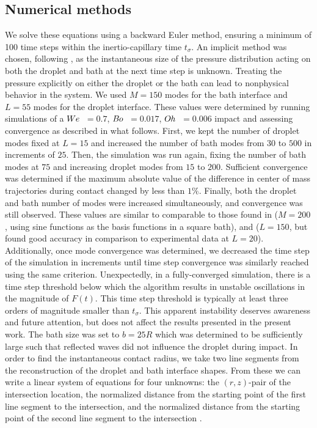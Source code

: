 \documentclass{jfm}
\begin{document}
\subsection{Numerical methods}
\hspace*{1em} We solve these equations using a backward Euler method, ensuring a minimum of 100 time steps within the inertio-capillary time $t_{\sigma}$. An implicit method was chosen, following \cite{galeano2021capillary}, as the instantaneous size of the pressure distribution acting on both the droplet and bath at the next time step is unknown. Treating the pressure explicitly on either the droplet or the bath can lead to nonphysical behavior in the system. We used $M=150$ modes for the bath interface and $L=55$ modes for the droplet interface. These values were determined by running simulations of a $W\kern-0.03em e\,$ $=0.7$, $B\kern-0.04em o\,$ $=0.017$, $O\kern-0.04em h\,$ $=0.006$ impact and assessing convergence as described in what follows. First, we kept the number of droplet modes fixed at $L=15$ and increased the number of bath modes from $30$ to $500$ in increments of $25$. Then, the simulation was run again, fixing the number of bath modes at $75$ and increasing droplet modes from $15$ to $200$. Sufficient convergence was determined if the maximum absolute value of the difference in center of mass trajectories during contact changed by less than $1\%$. Finally, both the droplet and bath number of modes were increased simultaneously, and convergence was still observed. These values are similar to comparable to those found in \cite{blanchette2016modeling} ($M=200$, using sine functions as the basis functions in a square bath), and \cite{molavcek2012quasi} ($L=150$, but found good accuracy in comparison to experimental data at $L=20$). Additionally, once mode convergence was determined, we decreased the time step of the simulation in increments until time step convergence was similarly reached using the same criterion. Unexpectedly, in a fully-converged simulation, there is a time step threshold below which the algorithm results in unstable oscillations in the magnitude of $F(t)$. This time step threshold is typically at least three orders of magnitude smaller than $t_{\sigma}$. This apparent instability deserves awareness and future attention, but does not affect the results presented in the present work.  The bath size was set to $b=25 R$ which was determined to be sufficiently large such that reflected waves did not influence the droplet during impact. In order to find the instantaneous contact radius, we take two line segments from the reconstruction of the droplet and bath interface shapes. From these we can write a linear system of equations for four unknowns: the $(r,z)$-pair of the intersection location, the normalized distance from the starting point of the first line segment to the intersection, and the normalized distance from the starting point of the second line segment to the intersection \citep{intersections}. 
\end{document}
